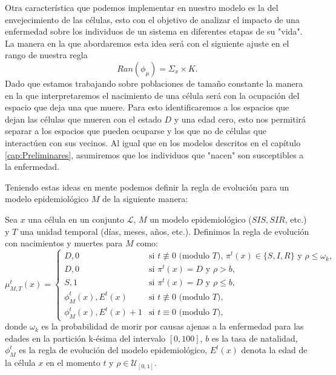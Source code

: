 Otra característica que podemos implementar en nuestro modelo es la del envejecimiento de las células, esto con el objetivo de analizar el impacto de una enfermedad sobre los individuos de un sistema en diferentes etapas de su "vida". La manera en la que abordaremos esta idea será con el siguiente ajuste en el rango de nuestra regla
$$Ran(\phi_\mu)=\Sigma_x\times K.$$
Dado que estamos trabajando sobre poblaciones de tamaño constante la manera en la que interpretaremos el nacimiento de una célula será con la ocupación del espacio que deja una que muere. Para esto identificaremos a los espacios que dejan las células que mueren con el estado $D$ y una edad cero, esto nos permitirá separar a los espacios que pueden ocuparse y los que no de células que interactúen con sus vecinos. Al igual que en los modelos descritos en el capítulo \ref{cap:Preliminares}, asumiremos que los individuos que "nacen" son susceptibles a la enfermedad.

Teniendo estas ideas en mente podemos definir la regla de evolución para un modelo epidemiológico $M$ de la siguiente manera:

\begin{definition}\label{def:reglaNatalidadyMortalidad}
Sea $x$ una célula en un conjunto $\mathcal{L}$, $M$ un modelo epidemiológico ($SIS, SIR$, etc.) y $T$ una unidad temporal (días, meses, años, etc.). Definimos la regla de evolución con nacimientos y muertes para $M$ como:
\begin{equation}
    \mu_{M,T}^t(x)=\left\{\begin{array}{ll}
        D,0 & \text{si }t\not\equiv 0 \text{ (modulo }T\text{), }\pi^t(x)\in\{S,I,R\}\text{ y }\rho\leq\omega_k, \\
        D,0 & \text{si }\pi^t(x)=D\text{ y }\rho>b,\\
        S,1 & \text{si }\pi^t(x)=D\text{ y }\rho\leq b,\\
        \phi_M^t(x),E^t(x) & \text{si }t\not\equiv 0 \text{ (modulo }T),\\
        \phi_M^t(x),E^t(x)+1 & \text{si }t\equiv 0 \text{ (modulo }T),
    \end{array}\right.
\end{equation}
donde $\omega_k$ es la probabilidad de morir por causas ajenas a la enfermedad para las edades en la partición k-ésima del intervalo $[0,100]$, $b$ es la tasa de natalidad, $\phi_M^t$ es la regla de evolución del modelo epidemiológico, $E^t(x)$ denota la edad de la célula $x$ en el momento $t$ y $\rho\in\mathcal{U}_{[0,1]}$.
\end{definition}

